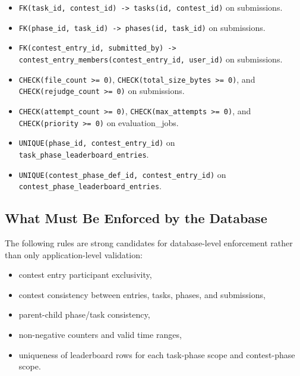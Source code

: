 \documentclass[11pt,a4paper]{article}
\begin{document}
\begin{itemize}
    \item \texttt{FK(task\_id, contest\_id) -> tasks(id, contest\_id)} on submissions.
    \item \texttt{FK(phase\_id, task\_id) -> phases(id, task\_id)} on submissions.
    \item \texttt{FK(contest\_entry\_id, submitted\_by) -> contest\_entry\_members(contest\_entry\_id, user\_id)} on submissions.
    \item \texttt{CHECK(file\_count >= 0)}, \texttt{CHECK(total\_size\_bytes >= 0)}, and \texttt{CHECK(rejudge\_count >= 0)} on submissions.
    \item \texttt{CHECK(attempt\_count >= 0)}, \texttt{CHECK(max\_attempts >= 0)}, and \texttt{CHECK(priority >= 0)} on evaluation\_jobs.
    \item \texttt{UNIQUE(phase\_id, contest\_entry\_id)} on \texttt{task\_phase\_leaderboard\_entries}.
    \item \texttt{UNIQUE(contest\_phase\_def\_id, contest\_entry\_id)} on \texttt{contest\_phase\_leaderboard\_entries}.
\end{itemize}

\subsection{What Must Be Enforced by the Database}
The following rules are strong candidates for database-level enforcement rather than only application-level validation:
\begin{itemize}
    \item contest entry participant exclusivity,
    \item contest consistency between entries, tasks, phases, and submissions,
    \item parent-child phase/task consistency,
    \item non-negative counters and valid time ranges,
    \item uniqueness of leaderboard rows for each task-phase scope and contest-phase scope.
\end{itemize}
\end{document}
